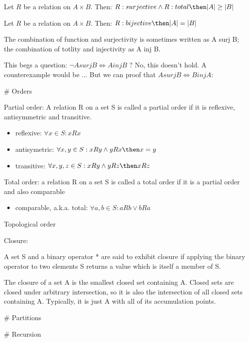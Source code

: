 \begin{theorem}
 Let $R$ be a relation on $ A \times B$. Then: 
 $ R:surjective \land R:total \then  |A| \geq |B|$
\end{theorem}

\begin{theorem}
 Let $R$ be a relation on $ A \times B$. Then: 
 $ R:bijective \then  |A| = |B|$
\end{theorem}

The combination of function and surjectivity is sometimes written as A surj B; the combination of totlity and injectivity as A inj B. 

This begs a question: $\lnot A surj B \iff A inj B $ ? 
No, this doesn't hold. A counterexample would be ...
But we can proof that $A surj B \iff B inj A$:

# Orders

\begin{definition}
    Partial order: A relation R on a set S is called a partial order if it is reflexive, antisymmetric and transitive.
    \begin{itemize}
        \item reflexive: $\forall x \in S: xRx$
        \item antisymetric: $\forall x,y \in S: xRy \land yRx \then x=y$
        \item transitive: $\forall x,y,z \in S: xRy \land yRz \then xRz$
    \end{itemize}
\end{definition}

\begin{definition}
    Total order: a relation R on a set S is called a total order if it is a partial order and also comparable
    \begin{itemize}
        \item comparable, a.k.a. total: $\forall a,b \in S: aRb \lor bRa$
    \end{itemize}
\end{definition}

\begin{definition}
    Topological order
\end{definition}

\begin{definition}
     Closure: 
     
     A set S and a binary operator * are said to exhibit closure if applying the binary operator to two elements S returns a value which is itself a member of S.

    The closure of a set A is the smallest closed set containing A. Closed sets are closed under arbitrary intersection, so it is also the intersection of all closed sets containing A. Typically, it is just A with all of its accumulation points. 
\end{definition}


# Partitions

# Recursion


